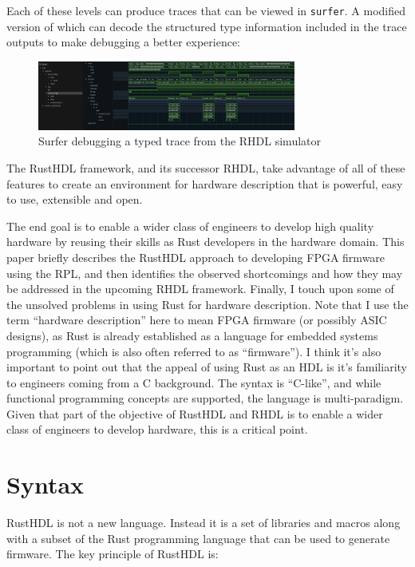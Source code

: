 \documentclass[sigplan,screen,sigconf]{acmart}
\begin{document}
Each of these levels can produce traces that can be viewed in \verb|surfer|.  A modified version of which can decode the structured type information included in the trace outputs to make debugging a better experience:

\begin{figure}[h]
  \centering
  \includegraphics[width=8.5cm]{surfer.png}
  \caption{Surfer debugging a typed trace from the RHDL simulator}
\end{figure}


The RustHDL framework, and its successor RHDL, take advantage of all of these features to
create an environment for hardware description that is powerful, easy to use, extensible and open.  

The end goal is to enable a wider class of engineers to develop high quality hardware by reusing 
their skills as Rust developers in the hardware domain.  This paper briefly describes the RustHDL 
approach to developing FPGA firmware using the RPL, and then identifies the observed shortcomings
 and how they may be addressed in the upcoming RHDL framework.  Finally, I touch upon some of the
  unsolved problems in using Rust for hardware description.  Note that I use the term ``hardware description'' 
  here to mean FPGA firmware (or possibly ASIC designs), as Rust is already established as a language 
  for embedded systems programming (which is also often referred to as ``firmware''). 
I think it's also important to point out that the appeal of using Rust as an HDL is it's familiarity
 to engineers coming from a C background.  The syntax is ``C-like'', and
while functional programming concepts are supported, the language is multi-paradigm.  Given that part 
of the objective of RustHDL and RHDL is to enable a wider class of engineers to develop hardware, 
this is a critical point.

\section{Syntax}
RustHDL is not a new language.  Instead it is a set of libraries and macros along with a 
subset of the Rust programming language that can be used to generate firmware.  The key
principle of RustHDL is:
\end{document}
